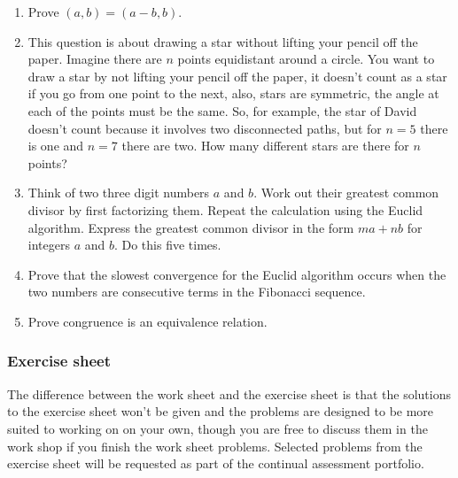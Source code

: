 \documentclass[12pt]{article}
\begin{document}
\begin{enumerate}
\item Prove $(a,b)=(a-b,b)$.

\item This question is about drawing a star without lifting your pencil
  off the paper. Imagine there are $n$ points equidistant around a
  circle. You want to draw a star by not lifting your pencil off the
  paper, it doesn't count as a star if you go from one point to the
  next, also, stars are symmetric, the angle at each of the points
  must be the same. So, for example, the star of David doesn't count
  because it involves two disconnected paths, but for $n=5$ there is
  one and $n=7$ there are two. How many different stars are there for
  $n$ points?

\item Think of two three digit numbers $a$ and $b$. Work out their greatest common divisor by first factorizing them. Repeat the calculation using the Euclid algorithm. Express the greatest common divisor in the form $ma+nb$ for integers $a$ and $b$.
Do this five times.

\item Prove that the slowest convergence for the Euclid algorithm occurs when the two numbers are consecutive terms in the Fibonacci sequence. 


\item Prove congruence is an equivalence relation.

\end{enumerate}

\subsubsection*{Exercise sheet}

The difference between the work sheet and the exercise sheet is that
the solutions to the exercise sheet won't be given and the problems
are designed to be more suited to working on on your own, though you
are free to discuss them in the work shop if you finish the work sheet
problems. Selected problems from the exercise sheet will be requested
as part of the continual assessment portfolio.
\end{document}
